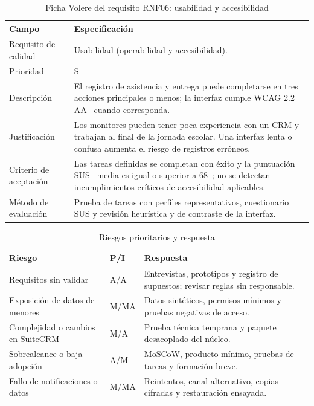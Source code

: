 \begin{table}[H]
\centering\small
\begin{tabularx}{\textwidth}{>{\hsize=0.385\hsize\raggedright\arraybackslash}X>{\hsize=1.615\hsize\raggedright\arraybackslash}X}
\toprule
\rowcolor{cabeceratabla} \textbf{Campo} & \textbf{Especificación} \\
\midrule
Requisito de calidad & Usabilidad (operabilidad y accesibilidad). \\
Prioridad & S \\
Descripción & El registro de asistencia y entrega puede completarse en tres acciones principales o menos; la interfaz cumple WCAG 2.2 AA~\cite{ref39} cuando corresponda. \\
Justificación & Los monitores pueden tener poca experiencia con un CRM y trabajan al final de la jornada escolar. Una interfaz lenta o confusa aumenta el riesgo de registros erróneos. \\
Criterio de aceptación & Las tareas definidas se completan con éxito y la puntuación SUS~\cite{ref40} media es igual o superior a 68~\cite{ref41}; no se detectan incumplimientos críticos de accesibilidad aplicables. \\
Método de evaluación & Prueba de tareas con perfiles representativos, cuestionario SUS y revisión heurística y de contraste de la interfaz. \\
\bottomrule
\end{tabularx}
\caption{Ficha Volere del requisito RNF06: usabilidad y accesibilidad}\label{tab:rnf06}
\end{table}

\begin{table}[H]
\centering\small
\begin{tabularx}{\textwidth}{>{\hsize=0.974\hsize\raggedright\arraybackslash}X>{\hsize=0.215\hsize\raggedright\arraybackslash}X>{\hsize=1.811\hsize\raggedright\arraybackslash}X}
\toprule
\rowcolor{cabeceratabla} \textbf{Riesgo} & \textbf{P/I} & \textbf{Respuesta} \\
\midrule
Requisitos sin validar & A/A & Entrevistas, prototipos y registro de supuestos; revisar reglas sin responsable. \\
Exposición de datos de menores & M/MA & Datos sintéticos, permisos mínimos y pruebas negativas de acceso. \\
Complejidad o cambios en SuiteCRM & M/A & Prueba técnica temprana y paquete desacoplado del núcleo. \\
Sobrealcance o baja adopción & A/M & MoSCoW, producto mínimo, pruebas de tareas y formación breve. \\
Fallo de notificaciones o datos & M/MA & Reintentos, canal alternativo, copias cifradas y restauración ensayada. \\
\bottomrule
\end{tabularx}
\caption{Riesgos prioritarios y respuesta}\label{tab:6}
\end{table}


